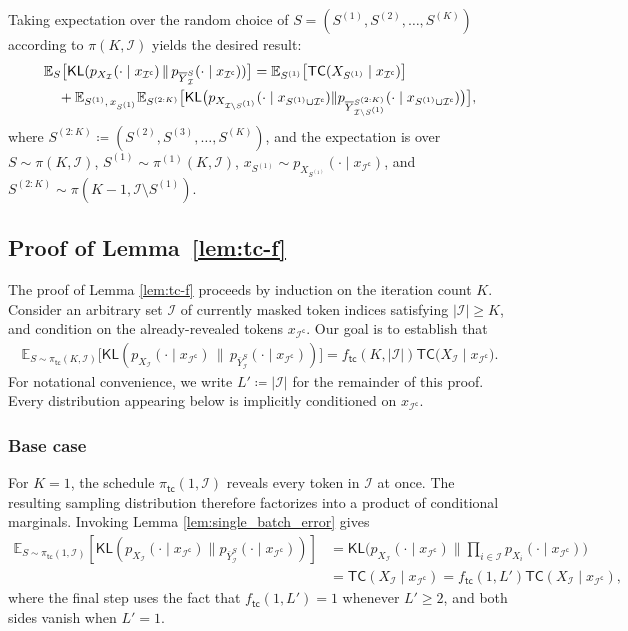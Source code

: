 \documentclass[english]{article}
\newcommand{\defn}{\coloneqq}
\newcommand{\cI}{\mathcal{I}}
\newcommand{\bE}{\mathbb{E}}
\newcommand{\KL}{\mathsf{KL}}
\newcommand{\ol}{\overline}
\newcommand{\E}{\mathbb{E}}
\newcommand{\TC}{\mathsf{TC}}
\newcommand{\tc}{\mathsf{tc}}
\begin{document}
Taking expectation over the random choice of $ S = (S^{(1)}, S^{(2)}, \ldots, S^{(K)}) $ according to $ \pi(K, \cI)$ yields the desired result:
\begin{align*}
    & \bE_{S} \big[\KL(p_{X_{\cI}}(\cdot \mid x_{\cI^\mathsf{c}}) \,\|\, p_{\ol Y_{\cI}^S}(\cdot \mid x_{\cI^\mathsf{c}}  ))\big]
     = \bE_{S^{(1)}} \big[ \TC(X_{S^{(1)}}\mid x_{\cI^\mathsf{c}}) \big] \notag\\ 
    & \quad + \bE_{S^{(1)},\,x_{S^{(1)}}} \bE_{S^{(2:K)}} \big[\KL \big(p_{X_{\cI \setminus S^{(1)}}}(\cdot \mid x_{S^{(1)} \cup \cI^\mathsf{c}}) \| p_{\ol Y_{\cI \setminus S^{(1)}}^{S^{(2:K)}}}(\cdot \mid x_{S^{(1)} \cup \cI^\mathsf{c}} ) \big) \big],
\end{align*}
where $S^{(2:K)} \defn (S^{(2)}, S^{(3)}, \ldots, S^{(K)})$, and the expectation is over $ S \sim \pi(K, \cI) $, $ S^{(1)} \sim \pi^{(1)}(K, \cI) $, $x_{S^{(1)}} \sim p_{X_{S^{(1)}}}(\cdot \mid x_{\cI^\mathsf{c}})$, and $S^{(2:K)} \sim \pi(K-1, \cI \setminus S^{(1)})$.


\subsection{Proof of Lemma~\ref{lem:tc-f}}
\label{sec:proof-tc-f}


The proof of Lemma \ref{lem:tc-f} proceeds by induction on the iteration count $K$. Consider an arbitrary set $\cI$ of currently masked token indices satisfying $|\cI| \geq K$, and condition on the already-revealed tokens $x_{\cI^\mathsf{c}}$. Our goal is to establish that
\begin{align*}
    \E_{S \sim \pi_{\tc}(K, \cI)} \big[\KL(p_{X_{\cI}}(\cdot \mid x_{\cI^\mathsf{c}}) \,\|\, p_{\ol Y_{\cI}^S}(\cdot \mid x_{\cI^\mathsf{c}} ) ) \big] = f_\tc(K, |\cI|) \TC \big(X_{\cI}\mid x_{\cI^\mathsf{c}} \big).
\end{align*}
For notational convenience, we write $ L' \defn |\cI| $ for the remainder of this proof.
Every distribution appearing below is implicitly conditioned on $x_{\cI^\mathsf{c}}$.

\subsubsection{Base case} For $ K = 1 $, the schedule $ \pi_{\tc}(1, \cI) $ reveals every token in $\cI$ at once. 
The resulting sampling distribution therefore factorizes into a product of conditional marginals. Invoking Lemma \ref{lem:single_batch_error} gives
\begin{align*}
    \E_{S \sim \pi_{\tc}(1, \cI)}[\KL(p_{X_{\cI}}(\cdot \mid x_{\cI^\mathsf{c}}) \| p_{\ol Y_{\cI}^S}(\cdot \mid x_{\cI^\mathsf{c}})  )] &= \KL\big(p_{X_{\cI}}(\cdot \mid x_{\cI^\mathsf{c}}) \| \prod_{i \in \cI} p_{X_i}(\cdot \mid x_{\cI^\mathsf{c}})   \big) \\
    &= \TC(X_{\cI} \mid x_{\cI^\mathsf{c}}) = f_\tc(1, L') \TC(X_{\cI} \mid x_{\cI^\mathsf{c}}),
\end{align*}
where the final step uses the fact that $ f_\tc(1, L') = 1 $ whenever $ L' \geq 2 $, and both sides vanish when $ L'=1 $.
\end{document}
